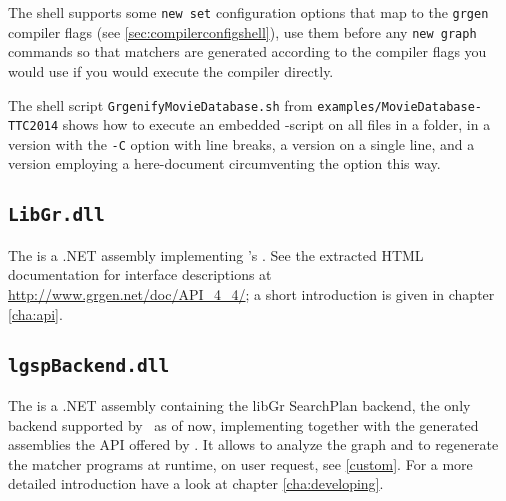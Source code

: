 \begin{note}
The shell supports some \texttt{new set} configuration options that map to the \texttt{grgen} compiler flags (see \ref{sec:compilerconfigshell}), use them before any \texttt{new graph} commands so that matchers are generated according to the compiler flags you would use if you would execute the compiler directly.
\end{note}

\begin{example}
The shell script \texttt{GrgenifyMovieDatabase.sh} from \texttt{examples/MovieDatabase-TTC2014} shows how to execute an embedded \GrShell-script on all files in a folder, in a version with the \texttt{-C} option with line breaks, a version on a single line, and a version employing a here-document circumventing the option this way.
\end{example}

\subsection{\texttt{LibGr.dll}}
\label{sct:API}
The \LibGr{} is a .NET assembly implementing \GrG's .
See the extracted HTML documentation for interface descriptions at \url{http://www.grgen.net/doc/API_4_4/};
a short introduction is given in chapter \ref{cha:api}.

\subsection{\texttt{lgspBackend.dll}}
The \LGSPBackend{} is a .NET assembly containing the libGr SearchPlan backend, the only backend supported by \GrG~as of now, implementing together with the generated assemblies the API offered by \LibGr.
It allows to analyze the graph and to regenerate the matcher programs at runtime, on user request, see \ref{custom}.
For a more detailed introduction have a look at chapter \ref{cha:developing}.

